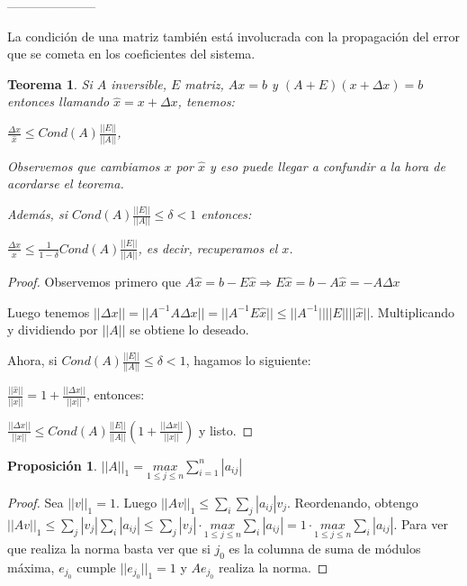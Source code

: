 \documentclass[10pt,a4paper,final]{report}
\newtheorem{theorem}{Teorema}
\newtheorem{proposition}{Proposición}
\begin{document}
{---------------------

La condición de una matriz también está involucrada con la propagación del error que se cometa en los coeficientes del sistema. \\


\begin{theorem}Si $A$ inversible, $E$ matriz, $Ax=b$ y $(A+E)(x+\Delta x) = b$ entonces llamando $\hat{x}=x+\Delta x$, tenemos:

$\frac{\Delta x}{\hat{x}}\leq Cond(A) \frac{||E||}{||A||}$,

Observemos que cambiamos $x$ por $\hat{x}$ y eso puede llegar a confundir a la hora de acordarse el teorema.

Además, si $Cond(A) \frac{||E||}{||A||}\leq \delta < 1$ entonces:

$\frac{\Delta x}{x}\leq \frac{1}{1-\delta}Cond(A) \frac{||E||}{||A||}$, es decir, recuperamos el $x$.
\end{theorem}


\begin{proof}
Observemos primero que $A \hat{x} = b - E \hat{x} \Rightarrow E \hat{x}= b - A \hat{x} = - A\Delta x$

Luego tenemos $||\Delta x|| = ||A^{-1} A \Delta x|| = ||A^{-1} E \hat{x}|| \leq ||A^{-1}|| ||E|| ||\hat{x}||$. Multiplicando y dividiendo por $||A||$ se obtiene lo deseado.



Ahora, si $Cond(A) \frac{||E||}{||A||}\leq \delta < 1$, hagamos lo siguiente:

$\frac{||\hat{x}||}{||x||} = 1 + \frac{||\Delta x||}{||x||}$, entonces:

$\frac{||\Delta x||}{||x||} \leq Cond(A) \frac{||E||}{||A||}(1 + \frac{||\Delta x||}{||x||})$ y listo.
\end{proof}

\begin{proposition}

$\displaystyle ||A||_1 = \underset{1\leq j \leq n}{max} \sum_{i=1}^n |a_{ij}|$

\end{proposition}

\begin{proof}
	Sea $||v||_1 = 1$. Luego $||Av||_1 \leq \displaystyle \sum_i \sum_j | a_{ij}| v_j$. Reordenando, obtengo $||Av||_1 \leq \displaystyle \sum_j |v_j| \displaystyle \sum_i |a_{ij}| \leq  \sum_j |v_j| \cdot \underset{1\leq j \leq n}{max} \sum_i |a_{ij}| = 1 \cdot \underset{1\leq j \leq n}{max} \sum_i |a_{ij}|$. Para ver que realiza la norma basta ver que si $j_0$ es la columna de suma de módulos máxima, $e_{j_0}$ cumple $||e_{j_0}||_1 = 1$ y $Ae_{j_0}$ realiza la norma.
\end{proof}

}
\end{document}
